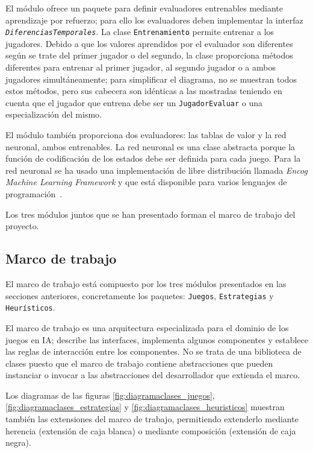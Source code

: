 El módulo ofrece un paquete para definir evaluadores entrenables mediante aprendizaje por refuerzo; para ello los evaluadores deben implementar la interfaz \texttt{\textit{DiferenciasTemporales}}.
La clase \texttt{Entrenamiento} permite entrenar a los jugadores.
Debido a que los valores aprendidos por el evaluador son diferentes según se trate del primer jugador o del segundo, la clase proporciona métodos diferentes para entrenar al primer jugador, al segundo jugador o a ambos jugadores simultáneamente; para simplificar el diagrama, no se muestran todos estos métodos, pero sus cabecera son idénticas a las mostradas teniendo en cuenta que el jugador que entrena debe ser un \texttt{JugadorEvaluar} o una especialización del mismo.

El módulo también proporciona dos evaluadores: las tablas de valor y la red neuronal, ambos entrenables.
La red neuronal es una clase abstracta porque la función de codificación de los estados debe ser definida para cada juego.
Para la red neuronal se ha usado una implementación de libre distribución llamada \textit{Encog Machine Learning Framework} y que está disponible para varios lenguajes de programación~.

\bigskip
Los tres módulos juntos que se han presentado forman el marco de trabajo del proyecto.

\subsection{Marco de trabajo}
\label{ssec:marco_trabajo}
El marco de trabajo está compuesto por los tres módulos presentados en las secciones anteriores, concretamente los paquetes: \texttt{Juegos}, \texttt{Estrategias} y \texttt{Heurísticos}.

El marco de trabajo es una arquitectura especializada para el dominio de los juegos en IA; describe las interfaces, implementa algunos componentes y establece las reglas de interacción entre los componentes.
No se trata de una biblioteca de clases puesto que el marco de trabajo contiene abstracciones que pueden instanciar o invocar a las abstracciones del desarrollador que extienda el marco.

Los diagramas de las figuras \ref{fig:diagramaclases_juegos}, \ref{fig:diagramaclases_estrategias} y \ref{fig:diagramaclases_heuristicos} muestran también las extensiones del marco de trabajo, permitiendo extenderlo mediante herencia (extensión de caja blanca) o mediante composición (extensión de caja negra).


